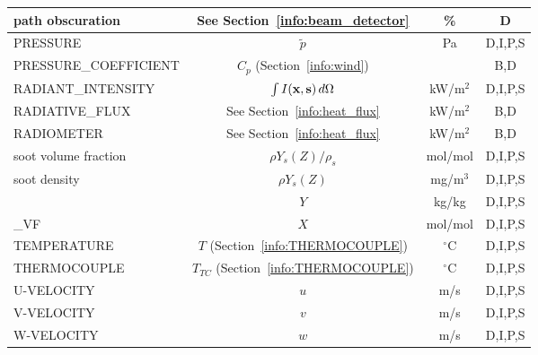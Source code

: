 \documentclass[11pt]{book}
\newcommand{\bx}{{\bf x}}
\newcommand{\bs}{{\bf s}}
\newcommand{\tp}{\tilde{p}}
\begin{document}
\begin{table}[h!]
\begin{center}
\begin{tabular}{|l|c|c|c|}
{\ct path obscuration}                          & See Section~\ref{info:beam_detector}          & \%             & D            \\ \hline
{\ct PRESSURE}                                  & $\tp$                                         & Pa             & D,I,P,S      \\ \hline
{\ct PRESSURE\_COEFFICIENT}                     & $C_p$ (Section~\ref{info:wind})               &                & B,D          \\ \hline
{\ct RADIANT\_INTENSITY}                        & $\int I(\bx,\bs)\, d\Omega$                   & kW/m$^2$       & D,I,P,S      \\ \hline
{\ct RADIATIVE\_FLUX}                           & See Section~\ref{info:heat_flux}              & kW/m$^2$       & B,D          \\ \hline
{\ct RADIOMETER}                                & See Section~\ref{info:heat_flux}              & kW/m$^2$       & B,D          \\ \hline
{\ct soot volume fraction}                      & $\rho Y_s(Z)/\rho_s$                          & mol/mol        & D,I,P,S      \\ \hline
{\ct soot density}                              & $\rho Y_s(Z)$                                 & mg/m$^3$       & D,I,P,S      \\ \hline
{\ct [SPEC\_ID]}                                & $Y$                                           & kg/kg          & D,I,P,S      \\ \hline
{\ct [SPEC\_ID]\_VF}                            & $X$                                           & mol/mol        & D,I,P,S      \\ \hline
{\ct TEMPERATURE}                               & $T$ (Section~\ref{info:THERMOCOUPLE})         & $^\circ$C      & D,I,P,S      \\ \hline
{\ct THERMOCOUPLE}                              & $T_{TC}$ (Section~\ref{info:THERMOCOUPLE})    & $^\circ$C      & D,I,P,S      \\ \hline
{\ct U-VELOCITY}                                & $u$                                           & m/s            & D,I,P,S      \\ \hline
{\ct V-VELOCITY}                                & $v$                                           & m/s            & D,I,P,S      \\ \hline
{\ct W-VELOCITY}                                & $w$                                           & m/s            & D,I,P,S      \\ \hline

\end{tabular}
\end{center}
\end{table}
\end{document}
